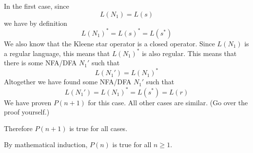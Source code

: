 In the first case,
since 
\[
L(N_1) = L(s)
\]
we have by definition
\[
L(N_1)^* = L(s)^* = L(s^*)
\]
We also know that the Kleene star operator is a closed operator.
Since $L(N_1)$ is a regular language, this means that 
$L(N_1)^*$ is also regular.
This means that there is some NFA/DFA $N_1'$ such that
\[
L(N_1') = L(N_1)^*
\]
Altogether we have found some NFA/DFA $N_1'$ such that
\[
L(N_1') = L(N_1)^* = L(s^*) = L(r)
\]
We have proven $P(n+1)$ for this case.
All other cases are similar. 
(Go over the proof yourself.)

Therefore $P(n+1)$ is true for all cases.

By mathematical induction, $P(n)$ is true for all $n \geq 1$.

